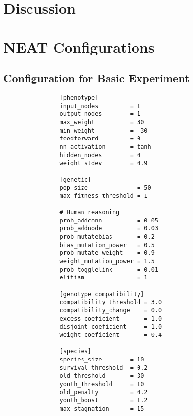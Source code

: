 \documentclass{article}
\begin{document}

	\section{Discussion} %
	\label{sec:discussion}
	\lipsum[14-20]
	\singlespacing
	\appendix
	\pagebreak
	\section{NEAT Configurations} %
	\label{sec:neat_configurations}
	
		\subsection{Configuration for Basic Experiment} %
		\label{sub:configuration_for_basic_experiment}
			\begin{verbatim}
				[phenotype]
				input_nodes         = 1
				output_nodes        = 1
				max_weight          = 30
				min_weight          = -30
				feedforward         = 0
				nn_activation       = tanh 
				hidden_nodes        = 0
				weight_stdev        = 0.9

				[genetic]
				pop_size              = 50
				max_fitness_threshold = 1

				# Human reasoning
				prob_addconn          = 0.05
				prob_addnode          = 0.03
				prob_mutatebias       = 0.2
				bias_mutation_power   = 0.5
				prob_mutate_weight    = 0.9
				weight_mutation_power = 1.5
				prob_togglelink       = 0.01
				elitism               = 1

				[genotype compatibility]
				compatibility_threshold = 3.0
				compatibility_change    = 0.0
				excess_coeficient       = 1.0
				disjoint_coeficient     = 1.0
				weight_coeficient       = 0.4

				[species]
				species_size        = 10
				survival_threshold  = 0.2
				old_threshold       = 30
				youth_threshold     = 10
				old_penalty         = 0.2
				youth_boost         = 1.2
				max_stagnation      = 15
			\end{verbatim}

		\pagebreak
\end{document}
